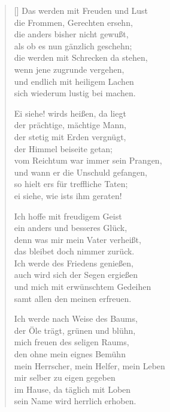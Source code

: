 \begin{multicols}{2}
\begin{verse}[\versewidth]
 Das werden mit Freuden und Lust\\
die Frommen, Gerechten ersehn,\\
die anders bisher nicht gewußt,\\
als ob es nun gänzlich geschehn;\\
die werden mit Schrecken da stehen,\\
wenn jene zugrunde vergehen,\\
und endlich mit heiligem Lachen\\
sich wiederum lustig bei machen.

 Ei siehe! wirds heißen, da liegt\\
der prächtige, mächtige Mann,\\
der stetig mit Erden vergnügt,\\
der Himmel beiseite getan;\\
vom Reichtum war immer sein Prangen,\\
und wann er die Unschuld gefangen,\\
so hielt ers für treffliche Taten;\\
ei siehe, wie ists ihm geraten!

 Ich hoffe mit freudigem Geist\\
ein anders und besseres Glück,\\
denn was mir mein Vater verheißt,\\
das bleibet doch nimmer zurück.\\
Ich werde des Friedens genießen,\\
auch wird sich der Segen ergießen\\
und mich mit erwünschtem Gedeihen\\
samt allen den meinen erfreuen.

 Ich werde nach Weise des Baums,\\
der Öle trägt, grünen und blühn,\\
mich freuen des seligen Raums,\\
den ohne mein eignes Bemühn\\
mein Herrscher, mein Helfer, mein Leben\\
mir selber zu eigen gegeben\\
im Hause, da täglich mit Loben\\
sein Name wird herrlich erhoben.

\end{verse}
\end{multicols}

